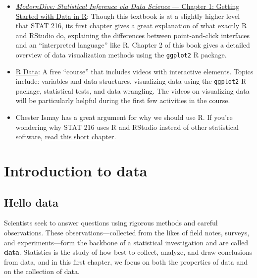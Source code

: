 \documentclass[
  10pt,
  openany]{book}
\providecommand{\tightlist}{%
  \setlength{\itemsep}{0pt}\setlength{\parskip}{0pt}}
\theoremstyle{definition}
\theoremstyle{definition}
\theoremstyle{definition}
\theoremstyle{definition}
\theoremstyle{remark}
\begin{document}
\begin{itemize}
  \begin{itemize}
  \tightlist
  \item
    \href{https://r4ds.had.co.nz/introduction.html\#rstudio}{What is RStudio and the tidyverse?}
  \item
    \href{https://r4ds.had.co.nz/introduction.html\#running-r-code}{How do I run R code?}
  \item
    \href{https://r4ds.had.co.nz/workflow-scripts.html}{What are R scripts?}
  \item
    \href{https://r4ds.had.co.nz/data-visualisation.html\#data-visualisation}{Data visualization with \texttt{ggplot}}
  \end{itemize}
\item
  \href{https://moderndive.com/1-getting-started.html}{\emph{ModernDive: Statistical Inference via Data Science} --- Chapter 1: Getting Started with Data in R}: Though this textbook is at a slightly higher level that STAT 216, its first chapter gives a great explanation of what exactly R and RStudio do, explaining the differences between point-and-click interfaces and an ``interpreted language'' like R. Chapter 2 of this book gives a detailed overview of data visualization methods using the \texttt{ggplot2} R package.
\item
  \href{http://varianceexplained.org/RData/}{R Data}: A free ``course'' that includes videos with interactive elements. Topics include: variables and data structures, visualizing data using the \texttt{ggplot2} R package, statistical tests, and data wrangling. The videos on visualizing data will be particularly helpful during the first few activities in the course.
\item
  Chester Ismay has a great argument for why we should use R. If you're wondering why STAT 216 uses R and RStudio instead of other statistical software, \href{https://bookdown.org/chesterismay/rbasics/2-whyR.html}{read this short chapter}.
\end{itemize}

\part{Introduction to data}\label{part-introduction-to-data}

\chapter{Hello data}\label{data-hello}

Scientists seek to answer questions using rigorous methods and careful observations.
These observations---collected from the likes of field notes, surveys, and experiments---form the backbone of a statistical investigation and are called \textbf{data}.
Statistics is the study of how best to collect, analyze, and draw conclusions from data, and in this first chapter, we focus on both the properties of data and on the collection of data.
\end{document}
